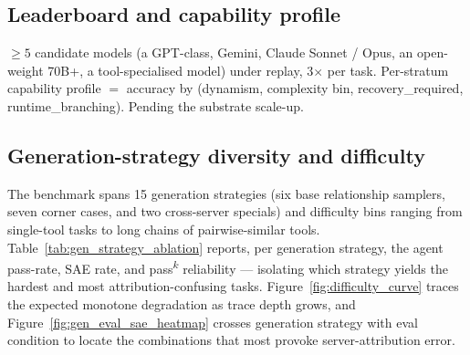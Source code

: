 

\subsection{Leaderboard and capability profile}
\label{sec:rq_leaderboard}

$\geq 5$ candidate models (a GPT-class, Gemini, Claude Sonnet / Opus,
an open-weight 70B+, a tool-specialised model) under replay,
3$\times$ per task. Per-stratum capability profile $=$ accuracy by
(dynamism, complexity bin, recovery\_required, runtime\_branching).
Pending the substrate scale-up.



\subsection{Generation-strategy diversity and difficulty}
\label{sec:rq_gen_strategy}

The benchmark spans 15 generation strategies (six base relationship
samplers, seven corner cases, and two cross-server specials) and
difficulty bins ranging from single-tool tasks to long chains of
pairwise-similar tools. Table~\ref{tab:gen_strategy_ablation} reports,
per generation strategy, the agent pass-rate, SAE rate, and
pass\textsuperscript{$k$} reliability --- isolating which strategy
yields the hardest and most attribution-confusing tasks.
Figure~\ref{fig:difficulty_curve} traces the expected monotone
degradation as trace depth grows, and
Figure~\ref{fig:gen_eval_sae_heatmap} crosses generation strategy with
eval condition to locate the combinations that most provoke
server-attribution error.







